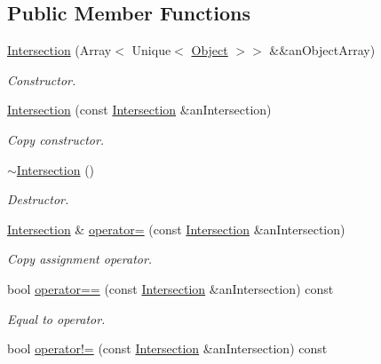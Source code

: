 \subsection*{Public Member Functions}
\begin{DoxyCompactItemize}
\item 
\hyperlink{classostk_1_1math_1_1geom_1_1d3_1_1_intersection_a6091ab689809d0da1e670ca18dffb2d8}{Intersection} (Array$<$ Unique$<$ \hyperlink{classostk_1_1math_1_1geom_1_1d3_1_1_object}{Object} $>$$>$ \&\&an\+Object\+Array)
\begin{DoxyCompactList}\small\item\em Constructor. \end{DoxyCompactList}\item 
\hyperlink{classostk_1_1math_1_1geom_1_1d3_1_1_intersection_a96367deb3f86ecd53ab37c7993c7f390}{Intersection} (const \hyperlink{classostk_1_1math_1_1geom_1_1d3_1_1_intersection}{Intersection} \&an\+Intersection)
\begin{DoxyCompactList}\small\item\em Copy constructor. \end{DoxyCompactList}\item 
\hyperlink{classostk_1_1math_1_1geom_1_1d3_1_1_intersection_a741440507bce2971e0e8943de5bb7981}{$\sim$\+Intersection} ()
\begin{DoxyCompactList}\small\item\em Destructor. \end{DoxyCompactList}\item 
\hyperlink{classostk_1_1math_1_1geom_1_1d3_1_1_intersection}{Intersection} \& \hyperlink{classostk_1_1math_1_1geom_1_1d3_1_1_intersection_a1f8d1f1b0554f31e797957800531d5fd}{operator=} (const \hyperlink{classostk_1_1math_1_1geom_1_1d3_1_1_intersection}{Intersection} \&an\+Intersection)
\begin{DoxyCompactList}\small\item\em Copy assignment operator. \end{DoxyCompactList}\item 
bool \hyperlink{classostk_1_1math_1_1geom_1_1d3_1_1_intersection_a1cc5592321e85d4cc875e73a4fc64499}{operator==} (const \hyperlink{classostk_1_1math_1_1geom_1_1d3_1_1_intersection}{Intersection} \&an\+Intersection) const
\begin{DoxyCompactList}\small\item\em Equal to operator. \end{DoxyCompactList}\item 
bool \hyperlink{classostk_1_1math_1_1geom_1_1d3_1_1_intersection_afab01392e8f6ecf6f6f605f24f47a3ed}{operator!=} (const \hyperlink{classostk_1_1math_1_1geom_1_1d3_1_1_intersection}{Intersection} \&an\+Intersection) const
$$
\end{DoxyCompactItemize}
